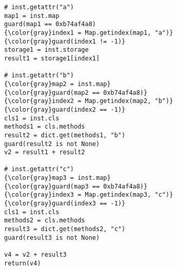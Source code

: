 \begin{Verbatim}[commandchars=\\\{\}]
# inst.getattr("a")
map1 = inst.map
guard(map1 == 0xb74af4a8)
{\color{gray}index1 = Map.getindex(map1, "a")}
{\color{gray}guard(index1 != -1)}
storage1 = inst.storage
result1 = storage1[index1]

# inst.getattr("b")
{\color{gray}map2 = inst.map}
{\color{gray}guard(map2 == 0xb74af4a8)}
{\color{gray}index2 = Map.getindex(map2, "b")}
{\color{gray}guard(index2 == -1)}
cls1 = inst.cls
methods1 = cls.methods
result2 = dict.get(methods1, "b")
guard(result2 is not None)
v2 = result1 + result2

# inst.getattr("c")
{\color{gray}map3 = inst.map}
{\color{gray}guard(map3 == 0xb74af4a8)}
{\color{gray}index3 = Map.getindex(map3, "c")}
{\color{gray}guard(index3 == -1)}
cls1 = inst.cls
methods2 = cls.methods
result3 = dict.get(methods2, "c")
guard(result3 is not None)

v4 = v2 + result3
return(v4)
\end{Verbatim}
